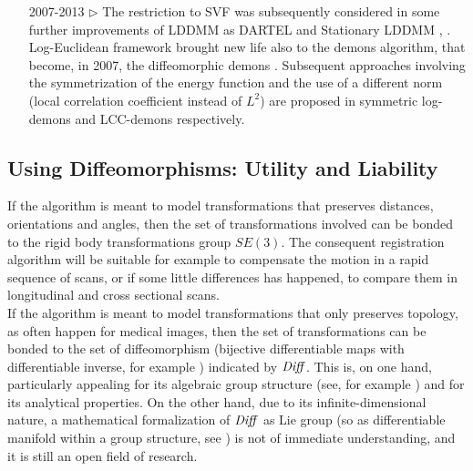 \begin{enumerate}
	\item[2007-2013 $\triangleright$] The restriction to SVF was subsequently considered in some further improvements of LDDMM  as DARTEL and Stationary LDDMM \cite{Ashburner:07}, \cite{hernandez2007registration}. 
	Log-Euclidean framework brought new life also to the demons algorithm, that  become, in 2007, the diffeomorphic demons \cite{vercauteren2007non}.
	Subsequent approaches involving the symmetrization of the energy function and the use of a different norm (local correlation coefficient instead of $L^{2}$) are proposed in symmetric log-demons \cite{vercauteren08} and LCC-demons \cite{lorenzi2013lcc} respectively.
	
\end{enumerate}


\subsection{Using Diffeomorphisms: Utility and Liability}\label{se:diffe_util_and_liab}

If the algorithm is meant to model transformations that preserves distances, orientations and angles, then the set of transformations involved can be bonded to the rigid body transformations group $SE(3)$. The consequent registration algorithm will be suitable for example to compensate the motion in a rapid sequence of scans, or if some little differences has happened, to compare them in longitudinal and cross sectional scans.\\

If the algorithm is meant to model transformations that only preserves topology, as often happen for medical images, then the set of transformations can be bonded to the set of diffeomorphism (bijective differentiable maps with differentiable inverse, for example \cite{lee2012introduction}) indicated by $\text{\emph{Diff}}$. This is, on one hand, particularly appealing for its algebraic group structure (see, for example \cite{artin2011algebra}) and for its analytical properties. On the other hand, due to its infinite-dimensional nature, a mathematical formalization of $\text{\emph{Diff}}$ as Lie group (so as differentiable manifold within a group structure, see \cite{warner}) is not of immediate understanding, and it is still an open field of research.\\

